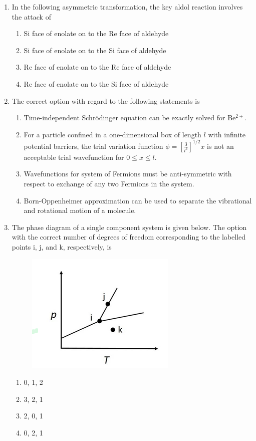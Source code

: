 \documentclass[journal,12pt,onecolumn]{IEEEtran}
\theoremstyle{remark}
\begin{document}
\begin{enumerate}
\item In the following asymmetric transformation, the key aldol reaction involves the attack of
    \begin{enumerate}
        \item Si face of enolate on to the Re face of aldehyde
        \item Si face of enolate on to the Si face of aldehyde
        \item Re face of enolate on to the Re face of aldehyde
        \item Re face of enolate on to the Si face of aldehyde
    \end{enumerate}      \hfill{}



\item The correct option with regard to the following statements is
    \begin{enumerate}
        \item {} Time-independent Schrödinger equation can be exactly solved for Be$^{2+}$.
        \item {} For a particle confined in a one-dimensional box of length $l$ with infinite potential barriers, the trial variation function $\phi = [\frac{3}{l^{3}}]^{1/2}x$ is not an acceptable trial wavefunction for $0 \le x \le l$.
        \item {} Wavefunctions for system of Fermions must be anti-symmetric with respect to exchange of any two Fermions in the system.
        \item {} Born-Oppenheimer approximation can be used to separate the vibrational and rotational motion of a molecule.
    \end{enumerate}      \hfill{}



\item The phase diagram of a single component system is given below. The option with the correct number of degrees of freedom corresponding to the labelled points i, j, and k, respectively, is
\begin{figure}[H]
        \centering
        \includegraphics[width=0.4\columnwidth]{figs/q46.png}
        \caption*{}
        \label{fig:placeholder}
    \end{figure}
    \begin{enumerate}
        \item 0, 1, 2
        \item 3, 2, 1
        \item 2, 0, 1
        \item 0, 2, 1
    \end{enumerate}      \hfill{}




\end{enumerate}
\end{document}
